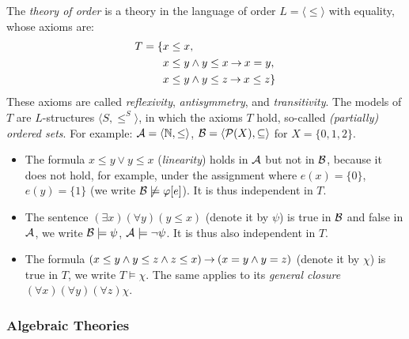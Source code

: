 The \emph{theory of order} is a theory in the language of order $L=\langle\leq\rangle$ with equality, whose axioms are:
\begin{align*}
    T=\{& x\leq x,\\
        & x\leq y\land y\leq x\mathbin{\rightarrow} x=y,\\
        & x\leq y\land y\leq z\mathbin{\rightarrow} x\leq z\}\\
\end{align*}
These axioms are called \emph{reflexivity}, \emph{antisymmetry}, and \emph{transitivity}. The models of $T$ are $L$-structures $\langle S,\leq^S\rangle$, in which the axioms $T$ hold, so-called \emph{(partially) ordered sets}. For example: $\mathcal{A}=\langle\mathbb N,\leq\rangle$, $\mathcal{B}=\langle\mathcal P(X),\subseteq\rangle$ for $X=\{0,1,2\}$.
\begin{itemize}
    \item The formula $x\leq y\lor y\leq x$ (\emph{linearity}) holds in $\mathcal{A}$ but not in $\mathcal{B}$, because it does not hold, for example, under the assignment where $e(x)=\{0\}$, $e(y)=\{1\}$ (we write $\mathcal{B}\not\models\varphi[e]$). It is thus independent in $T$.
    \item The sentence $(\exists x)(\forall y)(y\leq x)$ (denote it by $\psi$) is true in $\mathcal{B}$ and false in $\mathcal{A}$, we write $\mathcal{B}\models\psi$, $\mathcal{A}\models\neg\psi$. It is thus also independent in $T$.
    \item The formula $(x\leq y\land y\leq z\land z\leq x)\mathbin{\rightarrow} (x=y\land y=z)$ (denote it by $\chi$) is true in $T$, we write $T\models\chi$. The same applies to its \emph{general closure} $(\forall x)(\forall y)(\forall z)\chi$.
\end{itemize}

\subsubsection{Algebraic Theories}

